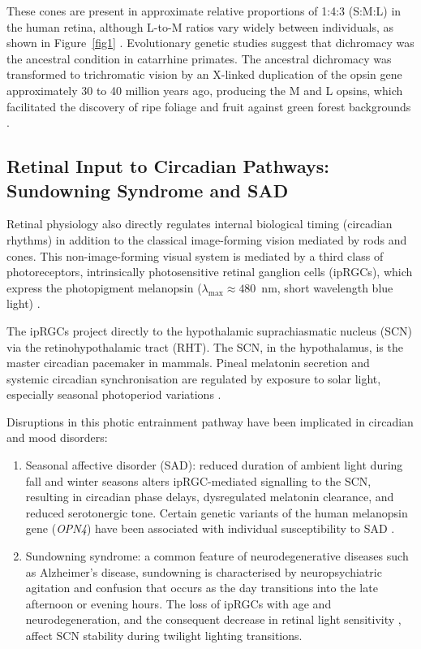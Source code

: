 \documentclass[brainsci,article,submit,moreauthors]{Definitions/mdpi}
\begin{document}
These cones are present in approximate relative proportions of 1:4:3 (S:M:L) in the human retina, although L-to-M ratios vary widely between individuals, as shown in Figure~\ref{fig1} \citep{roorda1999}. Evolutionary genetic studies suggest that dichromacy was the ancestral condition in catarrhine primates. The ancestral dichromacy was transformed to trichromatic vision by an X-linked duplication of the opsin gene approximately 30 to 40 million years ago, producing the M and L opsins, which facilitated the discovery of ripe foliage and fruit against green forest backgrounds \citep{dulai1999,surridge2003,hunt2017}.

\subsection{Retinal Input to Circadian Pathways: Sundowning Syndrome and SAD}

Retinal physiology also directly regulates internal biological timing (circadian rhythms) in addition to the classical image-forming vision mediated by rods and cones. This non-image-forming visual system is mediated by a third class of photoreceptors, intrinsically photosensitive retinal ganglion cells (ipRGCs), which express the photopigment melanopsin ($\lambda_{\max} \approx 480$~nm, short wavelength blue light) \citep{berson2002,hattar2002}.

The ipRGCs project directly to the hypothalamic suprachiasmatic nucleus (SCN) via the retinohypothalamic tract (RHT). The SCN, in the hypothalamus, is the master circadian pacemaker in mammals. Pineal melatonin secretion and systemic circadian synchronisation are regulated by exposure to solar light, especially seasonal photoperiod variations \citep{czeisler1999,schmidt2011}.

Disruptions in this photic entrainment pathway have been implicated in circadian and mood disorders:

\begin{enumerate}
\item Seasonal affective disorder (SAD): reduced duration of ambient light during fall and winter seasons alters ipRGC-mediated signalling to the SCN, resulting in circadian phase delays, dysregulated melatonin clearance, and reduced serotonergic tone. Certain genetic variants of the human melanopsin gene (\textit{OPN4}) have been associated with individual susceptibility to SAD \citep{roecklein2009,legates2014,ziolkowska2024}.
\item Sundowning syndrome: a common feature of neurodegenerative diseases such as Alzheimer's disease, sundowning is characterised by neuropsychiatric agitation and confusion that occurs as the day transitions into the late afternoon or evening hours. The loss of ipRGCs with age and neurodegeneration, and the consequent decrease in retinal light sensitivity \citep{lax2019,fountain2023}, affect SCN stability during twilight lighting transitions.
\end{enumerate}
\end{document}

